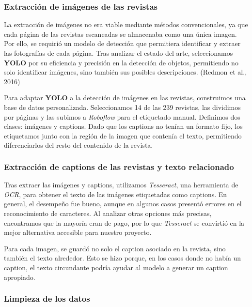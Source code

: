 \documentclass[14pt]{extarticle}
\begin{document}
\subsubsection{Extracción de imágenes de las revistas}

La extracción de imágenes no era viable mediante métodos convencionales, ya que cada página de las revistas escaneadas se almacenaba como una única imagen. Por ello, se requirió un modelo de detección que permitiera identificar y extraer las fotografías de cada página. Tras analizar el estado del arte, seleccionamos \textbf{YOLO} por su eficiencia y precisión en la detección de objetos, permitiendo no solo identificar imágenes, sino también sus posibles descripciones. (Redmon et al., 2016)

Para adaptar \textbf{YOLO} a la detección de imágenes en las revistas, construimos una base de datos personalizada. Seleccionamos 14 de las 239 revistas, las dividimos por páginas y las subimos a \textit{Roboflow} para el etiquetado manual. Definimos dos clases: imágenes y captions. Dado que los captions no tenían un formato fijo, los etiquetamos junto con la región de la imagen que contenía el texto, permitiendo diferenciarlos del resto del contenido de la revista.

\subsubsection{Extracción de captions de las revistas y texto relacionado}

Tras extraer las imágenes y captions, utilizamos \textit{Tesseract}, una herramienta de \textit{OCR}, para obtener el texto de las imágenes etiquetadas como captions. En general, el desempeño fue bueno, aunque en algunos casos presentó errores en el reconocimiento de caracteres. Al analizar otras opciones más precisas, encontramos que la mayoría eran de pago, por lo que \textit{Tesseract} se convirtió en la mejor alternativa accesible para nuestro proyecto.

Para cada imagen, se guardó no solo el caption asociado en la revista, sino también el texto alrededor. Esto se hizo porque, en los casos donde no había un caption, el texto circundante podría ayudar al modelo a generar un caption apropiado.

\subsubsection{Limpieza de los datos}
\end{document}
